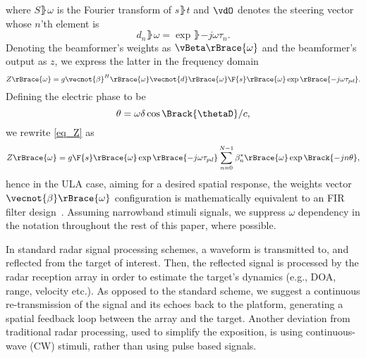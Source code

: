 where $S\rBrace{\omega}$ is the Fourier transform of $s\rBrace{t}$ and $\vdO$ denotes the steering vector whose $n$'th element is
\begin{equation}
    \label{eq:d}
    d_{n}\rBrace{\omega} = \exp{\rBrace{-j\omega\tau_{n}}}.
\end{equation}
Denoting the beamformer's weights as $\vBeta\rBrace{\omega}$ and the beamformer's output as $z$, we express the latter in the frequency domain
\begin{equation}
    \label{eq_Z}
    Z\rBrace{\omega} = g\vecnot{\beta}^{H}\rBrace{\omega}\vecnot{d}\rBrace{\omega}\F{s}\rBrace{\omega}\exp{\rBrace{-j\omega\tau_{pd}}}.
\end{equation}
Defining the electric phase to be
\begin{equation}\label{eq:thetaULA}
\theta=\omega{\delta\cos\Brack{\thetaD}}/{c},
\end{equation}
we rewrite \eqref{eq_Z} as 
\[
Z\rBrace{\omega} = g\F{s}\rBrace{\omega}\exp{\rBrace{-j\omega\tau_{pd}}}\sum_{n=0}^{N-1}\beta^{*}_{n}\rBrace{\omega}\exp\Brack{-jn\theta},
\]
hence in the ULA case, aiming for a desired spatial response, the weights vector $\vecnot{\beta}\rBrace{\omega}$ configuration is mathematically equivalent to an FIR filter design~\cite{van1988beamforming,benesty2018}. 
Assuming narrowband stimuli signals, we suppress $\omega$ dependency in the notation throughout the rest of this paper, where possible.
\par In standard radar signal processing schemes, a waveform is transmitted to, and reflected from the target of interest. Then, the reflected signal is processed by the radar reception array in order to estimate the target's dynamics (e.g., DOA, range, velocity etc.). 
As opposed to the standard scheme, we suggest a continuous re-transmission of the signal and its echoes back to the platform, generating a spatial feedback loop between the array and the target.
Another deviation from traditional radar processing, used to simplify the exposition, is using continuous-wave (CW) stimuli, rather than using pulse based signals. 
